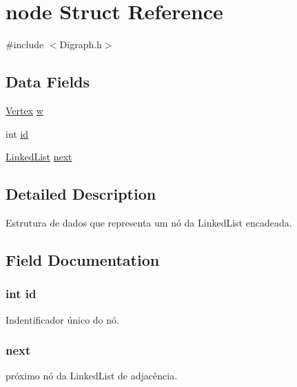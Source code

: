 \hypertarget{structnode}{}\section{node Struct Reference}
\label{structnode}


{\ttfamily \#include $<$Digraph.\+h$>$}

\subsection*{Data Fields}
\begin{DoxyCompactItemize}
\item 
\hyperlink{_digraph_8h_a053624c5d4ef5549d6a3e25bf6b27b08}{Vertex} \hyperlink{structnode_ac6c3e84cdc714053b54b0d3e63abc3b3}{w}
\item 
int \hyperlink{structnode_a7441ef0865bcb3db9b8064dd7375c1ea}{id}
\item 
\hyperlink{_digraph_8h_ac8d6ca4ecd16f6814fa28c52d4f68d4c}{Linked\+List} \hyperlink{structnode_a28376fb6508c939be3742d01c1472db8}{next}
\end{DoxyCompactItemize}


\subsection{Detailed Description}
Estrutura de dados que representa um nó da Linked\+List encadeada. 

\subsection{Field Documentation}
\subsubsection[{\texorpdfstring{id}{id}}]{\setlength{\rightskip}{0pt plus 5cm}int id}\hypertarget{structnode_a7441ef0865bcb3db9b8064dd7375c1ea}{}\label{structnode_a7441ef0865bcb3db9b8064dd7375c1ea}
Indentificador único do nó. 
\subsubsection[{\texorpdfstring{next}{next}}]{ next}\hypertarget{structnode_a28376fb6508c939be3742d01c1472db8}{}\label{structnode_a28376fb6508c939be3742d01c1472db8}
próximo nó da Linked\+List de adjacência. 
